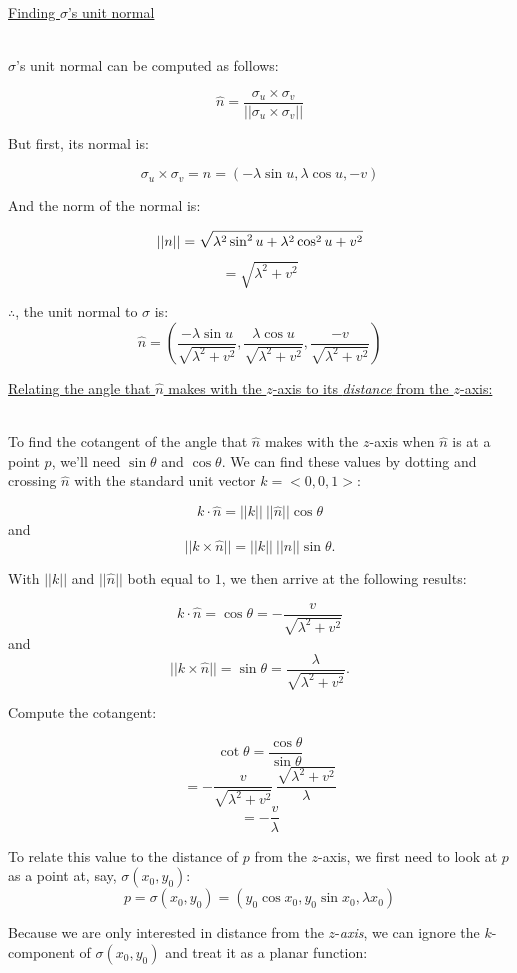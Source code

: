 \documentclass[12pt]{article}
\newcommand{\ulind}[1]
{
\noindent
\underline{#1}\\\\
\indent
}
\newcommand{\norm}[1]
{
||#1||
}
\begin{document}
\ulind{Finding $\sigma$'s unit normal}
$\sigma$'s unit normal can be computed as follows:

$$
\hat{n} = \frac{\sigma_u \times \sigma_v}{||\sigma_u \times \sigma_v||}
$$

But first, its normal is:

$$
\sigma_u \times \sigma_v = n = (-\lambda \sin u, \lambda \cos u, -v)
$$

And the norm of the normal is:

$$
||n|| = \sqrt{\lambda^2 \sin^2 u + \lambda^2 \cos^2 u + v^2}\\
$$
$$
= \sqrt{\lambda^2 + v^2}
$$

$\therefore$, the unit normal to $\sigma$ is:
$$
\hat{n} = \left(\frac{-\lambda \sin u}{\sqrt{\lambda^2+v^2}}, \frac{\lambda \cos u}{\sqrt{\lambda^2+v^2}}, \frac{-v}{\sqrt{\lambda^2+v^2}}\right)
$$

\clearpage

\ulind{Relating the angle that $\hat{n}$ makes with the $z$-axis to its \emph{distance} from the $z$-axis:}

To find the cotangent of the angle that $\hat{n}$ makes with the $z$-axis when $\hat{n}$ is at a point $p$, we'll need $\sin \theta$ and $\cos \theta$. We can find these values by dotting and crossing $\hat{n}$ with the standard unit vector $k = <0,0,1>$:

$$
k \cdot \hat{n} = \norm{k} \ \norm{\hat{n}}\cos \theta
$$
and
$$
\norm{k \times \hat{n}} = \norm{k} \ \norm{\hat{n}}\sin \theta.
$$

With $\norm{k}$ and $\norm{\hat{n}}$ both equal to $1$, we then arrive at the following results: 

$$
k \cdot \hat{n} = \cos \theta = -\frac{v}{\sqrt{\lambda^2+v^2}}
$$
and
$$
\norm{k \times \hat{n}} = \sin \theta  = \frac{\lambda}{\sqrt{\lambda^2+v^2}}.
$$

Compute the cotangent:

$$
\cot \theta = \frac{\cos \theta}{\sin \theta}
$$
$$
 = -\frac{v}{\sqrt{\lambda^2+v^2}} \ \frac{\sqrt{\lambda^2+v^2}}{\lambda}
$$
$$
= -\frac{v}{\lambda}
$$

To relate this value to the distance of $p$ from the $z$-axis, we first need to look at $p$ as a point at, say, $\sigma(x_0,y_0)$:
$$
p = \sigma(x_0,y_0) = (y_0 \cos x_0,y_0 \sin x_0,\lambda x_0)
$$

Because we are only interested in distance from the $z$-\emph{axis}, we can ignore the $k$-component of $\sigma(x_0,y_0)$ and treat it as a planar function:
\end{document}
